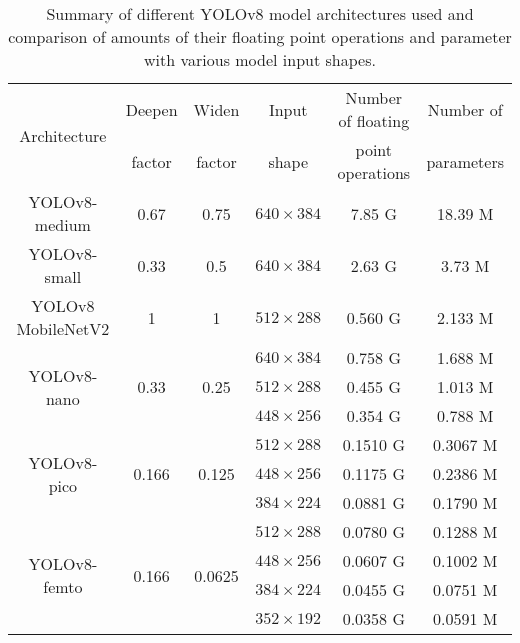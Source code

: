 \begin{table}[h]
\centering
\small
\begin{tabular}{|c|c|c|c|c|c|}
    \hline
    \multirow{2}{*}{Architecture}& Deepen                 & Widen                   & Input & Number of floating & Number of \\
                                 & factor                 & factor                  & shape & point operations   & parameters \\
    \hline
    \hline
    YOLOv8-medium                & 0.67                   & 0.75                    & $640 \times 384$ & 7.85 G & 18.39 M \\
    \hline
    YOLOv8-small                 & 0.33                   & 0.5                     & $640 \times 384$ & 2.63 G & 3.73 M \\
    \hline
    YOLOv8 MobileNetV2           & 1                      & 1                       & $512 \times 288$ & 0.560 G & 2.133 M \\
    \hline
    \multirow{3}{*}{YOLOv8-nano} & \multirow{3}{*}{0.33}  & \multirow{3}{*}{0.25}   & $640 \times 384$ & 0.758 G & 1.688 M \\
                                 &                        &                         & $512 \times 288$ & 0.455 G & 1.013 M \\
                                 &                        &                         & $448 \times 256$ & 0.354 G & 0.788 M \\
    \hline
    \multirow{3}{*}{YOLOv8-pico} & \multirow{3}{*}{0.166} & \multirow{3}{*}{0.125}  & $512 \times 288$ & 0.1510 G & 0.3067 M \\
                                 &                        &                         & $448 \times 256$ & 0.1175 G & 0.2386 M \\
                                 &                        &                         & $384 \times 224$ & 0.0881 G & 0.1790 M \\
    \hline
    \multirow{4}{*}{YOLOv8-femto}& \multirow{4}{*}{0.166} & \multirow{4}{*}{0.0625} & $512 \times 288$ & 0.0780 G & 0.1288 M \\
                                 &                        &                         & $448 \times 256$ & 0.0607 G & 0.1002 M \\
                                 &                        &                         & $384 \times 224$ & 0.0455 G & 0.0751 M \\
                                 &                        &                         & $352 \times 192$ & 0.0358 G & 0.0591 M \\
    \hline
\end{tabular}
\caption{Summary of different YOLOv8 model architectures used and comparison of amounts of their floating point operations and parameter with various model input shapes.}
\label{ModelArchitectures}
\end{table}


